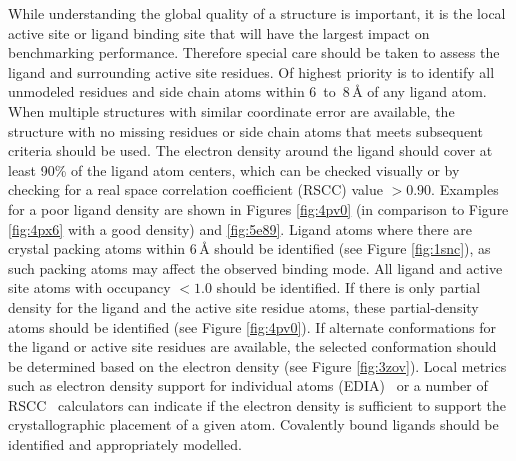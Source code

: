 \documentclass[9pt,bestpractices]{livecoms}
\begin{document}
While understanding the global quality of a structure is important, it is the local active site or ligand binding site that will have the largest impact on benchmarking performance. Therefore special care should be taken to assess the ligand and surrounding active site residues. 
%
Of highest priority is to identify all unmodeled residues and side chain atoms within 6~to~$8\,$\AA{} of any ligand atom. When multiple structures with similar coordinate error are available, the structure with no missing residues or side chain atoms that meets subsequent criteria should be used.
%
The electron density around the ligand should cover at least 90\% of the ligand atom centers, which can be checked visually or by checking for a real space correlation coefficient (RSCC) value $>0.90$. Examples for a poor ligand density are shown in Figures \ref{fig:4pv0} (in comparison to Figure \ref{fig:4px6} with a good density) and \ref{fig:5e89}. Ligand atoms where there are crystal packing atoms within $6\,$\AA{} should be identified (see Figure \ref{fig:1snc}), as such packing atoms may affect the observed binding mode. 
%
All ligand and active site atoms with occupancy $<1.0$ should be identified.
%
If there is only partial density for the ligand and the active site residue atoms, these partial-density atoms should be identified (see Figure \ref{fig:4pv0}). If alternate conformations for the ligand or active site residues are available, the selected conformation should be determined based on the electron density (see Figure \ref{fig:3zov}). Local metrics such as electron density support for individual atoms (EDIA)~\cite{meyder_estimating_2017} or a number of RSCC~\cite{tickle_statistical_2012} calculators can indicate if the electron density is sufficient to support the crystallographic placement of a given atom.
%
Covalently bound ligands should be identified and appropriately modelled.
\end{document}
